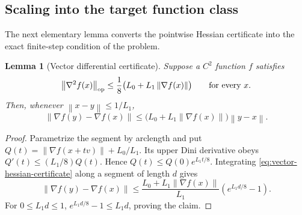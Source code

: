 \documentclass[11pt,a4paper]{article}
\newcommand{\norm}[1]{\left\lVert #1\right\rVert}
\newtheorem{lemma}[theorem]{Lemma}
\theoremstyle{remark}
\begin{document}
\subsection{Scaling into the target function class}

The next elementary lemma converts the pointwise Hessian certificate into
the exact finite-step condition of the problem.

\begin{lemma}[Vector differential certificate]
\label{lem:vector-differential-certificate}
Suppose a $C^2$ function $f$ satisfies
\begin{equation}
 \norm{\nabla^2f(x)}_{\rm op}
 \le\frac18\bigl(L_0+L_1\norm{\nabla f(x)}\bigr)
 \qquad\text{for every }x.
 \label{eq:vector-hessian-certificate}
\end{equation}
Then, whenever $\norm{x-y}\le1/L_1$,
\begin{equation}
 \norm{\nabla f(y)-\nabla f(x)}
 \le\bigl(L_0+L_1\norm{\nabla f(x)}\bigr)\norm{y-x}.
 \label{eq:vector-finite-step-certificate}
\end{equation}
\end{lemma}

\begin{proof}
Parametrize the segment by arclength and put
$Q(t)=\norm{\nabla f(x+tv)}+L_0/L_1$.  Its upper Dini derivative obeys
$Q'(t)\le(L_1/8)Q(t)$.  Hence
$Q(t)\le Q(0)e^{L_1t/8}$.  Integrating
\eqref{eq:vector-hessian-certificate} along a segment of length $d$ gives
\[
 \norm{\nabla f(y)-\nabla f(x)}
 \le\frac{L_0+L_1\norm{\nabla f(x)}}{L_1}
       (e^{L_1d/8}-1).
\]
For $0\le L_1d\le1$, $e^{L_1d/8}-1\le L_1d$, proving the claim.
\end{proof}
\end{document}
